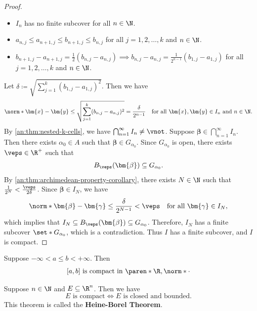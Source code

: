 \begin{proof}
\begin{itemize}
    \item $I_{n}$ has no finite subcover for all $n \in \N$.
    \item $a_{n, j} \leq a_{n + 1, j} \leq b_{n + 1, j} \leq b_{n, j}$ for all $j = 1, 2, \dots, k$ and $n \in \N$.
    \item $b_{n + 1, j} - a_{n + 1, j} = \frac{1}{2}(b_{n, j} - a_{n, j}) \implies b_{n, j} - a_{n, j} =
            \frac{1}{2^{n - 1}}(b_{1, j} - a_{1, j})$ for all $j = 1, 2, \dots, k$ and $n \in \N$.
  \end{itemize}
  Let $\delta \coloneqq \sqrt{\sum_{j = 1}^{k} (b_{1, j} - a_{1, j})^{2}}$. Then we have
  \[
    \norm*{\bm{x} - \bm{y}} \leq \sqrt{\sum_{j = 1}^{k} (b_{n, j} - a_{n, j})^{2}} =
    \frac{\delta}{2^{n - 1}} \quad \text{for all } \bm{x}, \bm{y} \in I_{n} \text{ and } n \in \N.
  \]
  By \cref{an:thm:nested-k-cells}, we have $\bigcap_{n = 1}^{\infty} I_{n} \neq \vnot$.
  Suppose $\bm{\beta} \in \bigcap_{n = 1}^{\infty} I_{n}$. Then there exists $\alpha_{0} \in A$
  such that $\bm{\beta} \in G_{\alpha_{0}}$. Since $G_{\alpha_{0}}$ is open, there exists $\veps \in \R^{+}$ such that
  \[
    B_{\veps}(\bm{\beta}) \subseteq G_{\alpha_{0}}.
  \]
  By \cref{an:thm:archimedean-property-corollary}, there exists $N \in \N$
  such that $\frac{1}{2^{N}} < \frac{\veps}{2\delta}$. Since $\bm{\beta} \in I_{N}$, we have
  \[
    \norm*{\bm{\beta} - \bm{\gamma}} \leq \frac{\delta}{2^{N - 1}} < \veps \quad \text{for all } \bm{\gamma} \in I_{N},
  \]
  which implies that $I_{N} \subseteq B_{\veps}(\bm{\beta}) \subseteq G_{\alpha_{0}}$. Therefore, $I_{N}$ has a
  finite subcover $\set*{G_{\alpha_{0}}}$, which is a contradiction. Thus $I$ has a finite subcover, and $I$ is compact.
\end{proof}

\bigskip

\begin{corollary} \label{an:cor:closed-interval-in-R-is-compact}
  Suppose $- \infty < a \leq b < + \infty$. Then
  \[
    [a, b] \text{ is compact in } \paren*{\R, \norm*{\cdot}}
  \]
\end{corollary}

\bigskip

\begin{theorem} \label{an:thm:heine-borel-theorem}
  Suppose $n \in \N$ and $E \subseteq \R^{n}$.
  Then we have
  \[
    E \text{ is compact} \iff E \text{ is closed and bounded}.
  \]
  This theorem is called the \textbf{Heine-Borel Theorem}.
\end{theorem}

